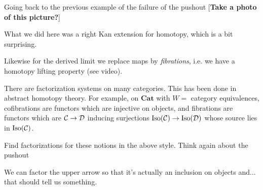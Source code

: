 \documentclass[../MH_Total.tex]{subfiles}
\begin{document}
Going back to the previous example of the failure of the pushout [\textbf{Take a photo of this picture?}]

What we did here was a right Kan extension for homotopy, which is a bit surprising.

Likewise for the derived limit we replace maps by \emph{fibrations}, i.e. we have a homotopy lifting property (see video).

There are factorization systems on many categories. This has been done in abstract homotopy theory. For example, on $\mathbf{Cat}$ with $W =$ category equivalences, cofibrations are functors which are injective on objects, and fibrations are functors which are $\mathcal{C} \to \mathcal{D}$ inducing surjections $\operatorname{Iso}(\mathcal{C}) \to \operatorname{Iso}(\mathcal{D})$ whose source lies in $\operatorname{Iso}(\mathcal{C})$. 

\begin{exercise}
	Find factorizations for these notions in the above style. Think again about the pushout 
		\begin{center}
	\end{center}
	We can factor the upper arrow so that it's actually an inclusion on objects and... that should tell us something.
\end{exercise}
\end{document}
